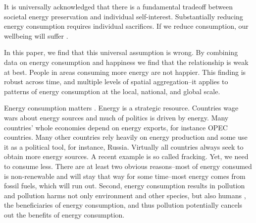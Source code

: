 \documentclass[10pt, letterpaper]{article}
\begin{document}
\begin{spacing}{1.4}
It is universally acknowledged that there is a fundamental tradeoff between
societal energy preservation and individual self-interest. Substantially reducing
energy consumption requires individual sacrifices. If we reduce consumption, our wellbeing will
suffer \cite{kenny_businessweek_aug_29_14, gordon_wsj_may_29_14, carter_pbs_apr_18_77}. 

In this paper, we find that this universal assumption is wrong.  By combining
data on energy consumption and happiness we find that the
relationship is weak at best. %
 People in areas consuming more energy are not happier.
This finding is robust across time, and multiple levels of spatial aggregation--it applies to patterns of energy consumption  at the local, national, and global scale.  



Energy consumption matters%
. Energy is a strategic
resource. Countries wage wars about energy sources  and much of politics is
driven by energy. Many countries' whole economies depend on energy exports, for instance OPEC countries. Many other countries rely heavily on energy production
and some use it as a political tool, for instance, Russia.   
Virtually all countries  always seek to obtain more energy sources. A recent example is so called
fracking. Yet, we need to consume less. There are at least two
obvious reasons--most of energy consumed  is non-renewable and will stay
that way for some time\cite{mackay08}--most energy comes from
fossil fuels, which will run out. %
Second, energy consumption results in pollution and pollution harms not only
 environment and other species, but also  humans \cite{mackerron09,gandelman12,ferreira13}, the beneficiaries of energy
consumption, and thus pollution potentially cancels out the benefits of energy
consumption. 
 

\end{spacing}
\end{document}
